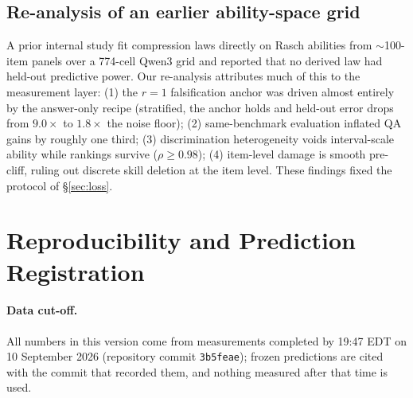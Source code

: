 \subsection{Re-analysis of an earlier ability-space grid}

A prior internal study fit compression laws directly on Rasch
abilities from $\sim$100-item panels over a 774-cell Qwen3 grid and
reported that no derived law had held-out predictive power. Our
re-analysis attributes much of this to the measurement layer:
(1) the $r{=}1$ falsification anchor was driven almost entirely by the
answer-only recipe (stratified, the anchor holds and held-out error
drops from $9.0\times$ to $1.8\times$ the noise floor); (2)
same-benchmark evaluation inflated QA gains by roughly one third;
(3) discrimination heterogeneity voids interval-scale ability while
rankings survive ($\rho\ge0.98$); (4) item-level damage is smooth
pre-cliff, ruling out discrete skill deletion at the item level.
These findings fixed the protocol of \S\ref{sec:loss}.


\section{Reproducibility and Prediction Registration}
\label{sec:app_registration}

\paragraph{Data cut-off.} All numbers in this version come from
measurements completed by 19:47 EDT on 10 September 2026 (repository
commit \texttt{3b5feae}); frozen predictions are cited with the commit
that recorded them, and nothing measured after that time is used.
